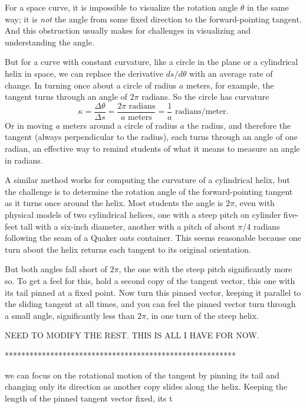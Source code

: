 \documentclass{ximera}
\begin{document}
For a space curve, it is impossible to visualize the rotation angle $\theta$ in the same way; it is \emph{not} the angle from some fixed direction to the forward-pointing tangent. And this obstruction usually makes for challenges in visualizing and understanding the angle.

But for a curve with constant curvature, like a circle in the plane or a cylindrical helix in space, we can replace the derivative $ds/d\theta$ with an average rate of change. In turning once about a circle of radius $a$ meters, for example, the tangent turns through an angle of $2\pi$ radians. So the circle has curvature 
\[
 \kappa = \frac{\Delta \theta}{\Delta s} = \frac{2\pi \text{ radians}}{a \text{ meters}} = \frac{1}{a} \text{ radians/meter}.             %
\]
Or in moving $a$ meters around a circle of radius $a$ the radius, and therefore the tangent (always perpendicular to the radius), each turns through an angle of one radian, an effective way to remind students of what it means to measure an angle in radians.

A similar method works for computing the curvature of a cylindrical helix, but the challenge is to determine the rotation angle of the forward-pointing tangent as it turns once around the helix. Most students the angle is $2\pi$, even with physical models of two cylindrical helices, one with a steep pitch on cylinder five-feet tall with a six-inch diameter, another with a pitch of about $\pi/4$ radians following the seam of a Quaker oats container. This seems reasonable because one turn about the helix returns each tangent to its original orientation.

But both angles fall short of $2\pi$, the one with the steep pitch significantly more so. To get a feel for this, hold a second copy of the tangent vector, this one with its tail pinned at a fixed point. Now turn this pinned vector, keeping it parallel to the sliding tangent at all times, and you can feel the pinned vector turn through a small angle, significantly less than $2\pi$, in one turn of the steep helix. 

NEED TO MODIFY THE REST. THIS IS ALL I HAVE FOR NOW.

********************************************************


we can focus on the rotational motion of the tangent by pinning its tail and changing only its direction as another copy slides along the helix. Keeping the length of the pinned tangent vector fixed, its t
\end{document}
